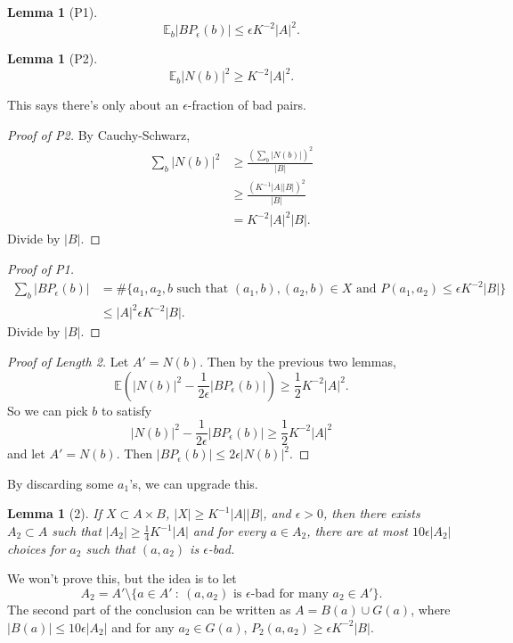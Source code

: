 \documentclass[12pt]{amsart}
\newtheorem{lemma}[theorem]{Lemma}
\begin{document}
\begin{lemma}[P1]
    \[
        \mathbb{E}_b |BP_\epsilon(b)| \leq \epsilon K^{-2} |A|^2.
    \]
\end{lemma}
\begin{lemma}[P2]
    \[
        \mathbb{E}_b |N(b)|^2 \geq K^{-2} |A|^2.
    \]
\end{lemma}
This says there's only about an $\epsilon$-fraction of bad pairs.
\begin{proof}[Proof of P2]
    By Cauchy-Schwarz,
    \begin{align*}
        \sum_b |N(b)|^2 & \geq \frac{\left( \sum_b |N(b)| \right)^2}{|B|} \\
        & \geq \frac{(K^{-1} |A||B|)^2}{|B|} \\
        & = K^{-2} |A|^2 |B|.
    \end{align*}
    Divide by $|B|$.
\end{proof}
\begin{proof}[Proof of P1]
    \begin{align*}
        \sum_b |BP_\epsilon(b)| & = \# \{ \text{$a_1, a_2, b$ such that $(a_1, b), (a_2, b) \in X$ and $P(a_1, a_2) \leq \epsilon K^{-2} |B|$} \} \\
        & \leq |A|^2 \epsilon K^{-2} |B|.
    \end{align*}
    Divide by $|B|$.
\end{proof}
\begin{proof}[Proof of Length 2]
    Let $A' = N(b)$. Then by the previous two lemmas,
    \[
        \mathbb{E} \left( |N(b)|^2 - \frac{1}{2\epsilon} |BP_\epsilon(b)| \right) \geq \frac{1}{2} K^{-2} |A|^2.
    \]
    So we can pick $b$ to satisfy
    \[
        |N(b)|^2 - \frac{1}{2\epsilon} |BP_\epsilon(b)| \geq \frac{1}{2} K^{-2} |A|^2
    \]
    and let $A' = N(b)$. Then $|BP_\epsilon(b)| \leq 2\epsilon |N(b)|^2$.
\end{proof}
By discarding some $a_1$'s, we can upgrade this.
\begin{lemma}[2]
    If $X \subset A \times B$, $|X| \geq K^{-1} |A||B|$, and $\epsilon > 0$, then there exists $A_2 \subset A$ such that $|A_2| \geq \frac{1}{4} K^{-1} |A|$ and for every $a \in A_2$, there are at most $10\epsilon |A_2|$ choices for $a_2$ such that $(a, a_2)$ is $\epsilon$-bad.
\end{lemma}
We won't prove this, but the idea is to let
\[
    A_2 = A' \setminus \{ a \in A' \ : \ \text{$(a, a_2)$ is $\epsilon$-bad for many $a_2 \in A'$} \}.
\]
The second part of the conclusion can be written as $A = B(a) \cup G(a)$, where $|B(a)| \leq 10\epsilon |A_2|$ and for any $a_2 \in G(a)$, $P_2(a, a_2) \geq \epsilon K^{-2} |B|$.
\end{document}
